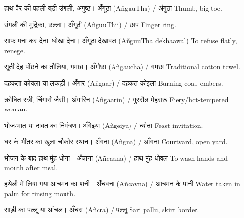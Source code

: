 %
{हाथ-पैर की पहली बड़ी उंगली, अंगुष्ठ।}%
{अँगूठा (AñguuTha) / अंगुठा}%
{Thumb, big toe.}

%
{उंगली की मुद्रिका, छल्ला।}%
{अँगूठी (AñguuThii) / छाप}%
{Finger ring.}

%
{साफ मना कर देना, धोखा देना।}%
{अँगूठा देखावल (AñguuTha dekhaawal)}%
{To refuse flatly, renege.}

%
{सूती देह पोंछने का तौलिया, गमछा।}%
{अँगौछा (Añgaucha) / गमछा}%
{Traditional cotton towel.}

%
{दहकता कोयला या लकड़ी।}%
{अँगार (Añgaar) / दहकत कोइला}%
{Burning coal, embers.}

%
{क्रोधित स्त्री, चिंगारी जैसी।}%
{अँगारिन (Añgaarin) / गुस्सैल मेहरारू}%
{Fiery/hot-tempered woman.}

%
{भोज-भात या दावत का निमंत्रण।}%
{अँगेइया (Añgeiya) / न्योता}%
{Feast invitation.}

%
{घर के भीतर का खुला चौकोर स्थान।}%
{अँगना (Añgna) / आँगना}%
{Courtyard, open yard.}

%
{भोजन के बाद हाथ-मुंह धोना।}%
{अँचाना (Añcaana) / हाथ-मुंह धोवल}%
{To wash hands and mouth after meal.}

%
{हथेली में लिया गया आचमन का पानी।}%
{अँचवना (Añcavna) / आचमन के पानी}%
{Water taken in palm for rinsing mouth.}

%
{साड़ी का पल्लू या आंचल।}%
{अँचरा (Añcra) / पल्लू}%
{Sari pallu, skirt border.}

